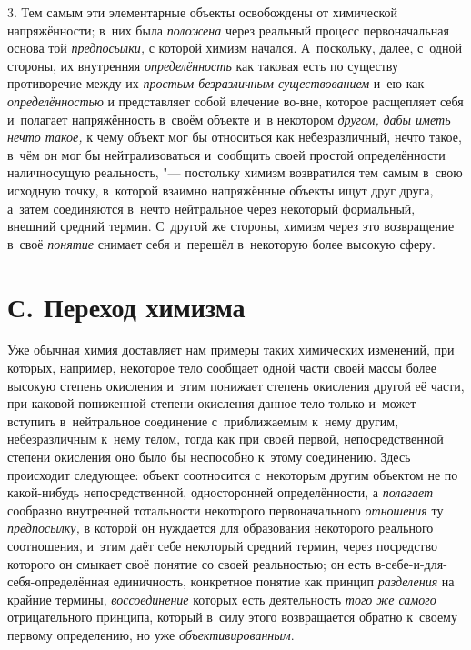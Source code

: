 3. Тем самым эти элементарные объекты освобождены от
химической напряжённости; в~них была
{\em положена} через
реальный процесс первоначальная основа той
{\em предпосылки,} с
которой химизм начался. А~поскольку, далее, с~одной стороны, их внутренняя
{\em определённость} как
таковая есть по существу противоречие между их
{\em простым безразличным
существованием} и~ею как
{\em определённостью} и
представляет собой влечение во-вне, которое расщепляет себя и~полагает
напряжённость в~своём объекте и~в некотором
{\em другом,}
{\em дабы иметь нечто такое,}
к чему объект мог бы относиться как небезразличный, нечто
такое, в~чём он мог бы нейтрализоваться и~сообщить своей простой
определённости наличносущую реальность, "--- постольку химизм
возвратился тем самым в~свою исходную точку, в~которой взаимно напряжённые
объекты ищут друг друга, а~затем соединяются в~нечто нейтральное через
некоторый формальный, внешний средний термин. С~другой же стороны, химизм
через это возвращение в~своё
{\em понятие} снимает
себя и~перешёл в~некоторую более высокую сферу.

\section[С. Переход химизма]{С. Переход химизма}

Уже обычная химия доставляет нам примеры таких химических
изменений, при которых, например, некоторое тело сообщает одной части своей
массы более высокую степень окисления и~этим понижает степень окисления
другой её части, при каковой пониженной степени окисления данное тело
только и~может вступить в~нейтральное соединение с~приближаемым к~нему
другим, небезразличным к~нему телом, тогда как при своей первой,
непосредственной степени окисления оно было бы неспособно к~этому
соединению. Здесь происходит следующее: объект соотносится с~некоторым
другим объектом не по какой-нибудь непосредственной, односторонней
определённости, а {\em полагает}
сообразно внутренней тотальности некоторого
первоначального {\em отношения}
ту {\em предпосылку,}
в которой он нуждается для образования некоторого реального
соотношения, и~этим даёт себе некоторый средний термин, через посредство
которого он смыкает своё понятие со своей реальностью; он есть
в-себе-и-для-себя-определённая единичность, конкретное понятие
как принцип {\em разделения}
на крайние термины,
{\em воссоединение}
которых есть деятельность
{\em того же самого}
отрицательного принципа, который в~силу этого возвращается
обратно к~своему первому определению, но уже
{\em объективированным}.

